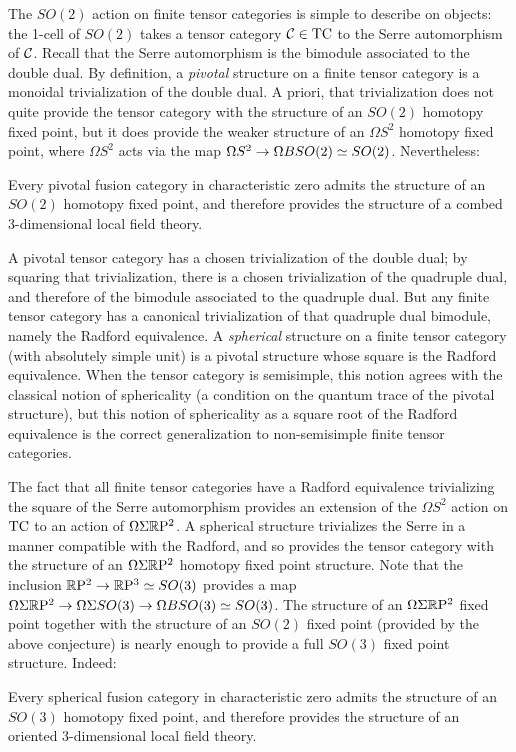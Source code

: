 \documentclass{amsart}
\begin{document}
The $SO(2)$ action on finite tensor categories is simple to describe on objects: the 1-cell of $SO(2)$ takes a tensor category $\mathcal C \in \mathrm{TC}$ to the Serre automorphism of $\mathcal C$.  Recall that the Serre automorphism is the bimodule associated to the double dual.  By definition, a \emph{pivotal} structure on a finite tensor category is a monoidal trivialization of the double dual.  A priori, that trivialization does not quite provide the tensor category with the structure of an $SO(2)$ homotopy fixed point, but it does provide the weaker structure of an $\Omega S^2$ homotopy fixed point, where $\Omega S^2$ acts via the map $\Omega S^2 \rightarrow \Omega BSO(2) \simeq SO(2)$.  Nevertheless:
\begin{mainconj}
Every pivotal fusion category in characteristic zero admits the structure of an $SO(2)$ homotopy fixed point, and therefore provides the structure of a combed 3-dimensional local field theory.
\end{mainconj}

A pivotal tensor category has a chosen trivialization of the double dual; by squaring that trivialization, there is a chosen trivialization of the quadruple dual, and therefore of the bimodule associated to the quadruple dual.  But any finite tensor category has a canonical trivialization of that quadruple dual bimodule, namely the Radford equivalence.  A \emph{spherical} structure on a finite tensor category (with absolutely simple unit) is a pivotal structure whose square is the Radford equivalence.  When the tensor category is semisimple, this notion agrees with the classical notion of sphericality (a condition on the quantum trace of the pivotal structure), but this notion of sphericality as a square root of the Radford equivalence is the correct generalization to non-semisimple finite tensor categories.  

The fact that all finite tensor categories have a Radford equivalence trivializing the square of the Serre automorphism provides an extension of the $\Omega S^2$ action on $\mathrm{TC}$ to an action of $\Omega \Sigma \mathbb R \mathrm{P}^2$.  A spherical structure trivializes the Serre in a manner compatible with the Radford, and so provides the tensor category with the structure of an $\Omega \Sigma \mathbb R \mathrm{P}^2$ homotopy fixed point structure.  Note that the inclusion $\mathbb R \mathrm{P}^2 \rightarrow \mathbb R \mathrm{P}^3 \simeq SO(3)$ provides a map $\Omega \Sigma \mathbb R \mathrm{P}^2 \rightarrow \Omega \Sigma SO(3) \rightarrow \Omega B SO(3) \simeq SO(3)$.  The structure of an $\Omega \Sigma \mathbb R \mathrm{P}^2$ fixed point together with the structure of an $SO(2)$ fixed point (provided by the above conjecture) is nearly enough to provide a full $SO(3)$ fixed point structure.  Indeed:
\begin{mainconj}
Every spherical fusion category in characteristic zero admits the structure of an $SO(3)$ homotopy fixed point, and therefore provides the structure of an oriented 3-dimensional local field theory.
\end{mainconj}
\end{document}

